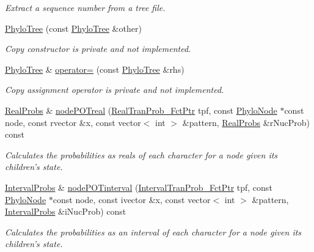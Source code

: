 \begin{DoxyCompactItemize}
\begin{DoxyCompactList}\small\item\em \-Extract a sequence number from a tree file. \end{DoxyCompactList}\item 
\hyperlink{classPhyloTree_a34906f6c4db42266e9f0ccb3057d2cb9}{\-Phylo\-Tree} (const \hyperlink{classPhyloTree}{\-Phylo\-Tree} \&other)
\begin{DoxyCompactList}\small\item\em \-Copy constructor is private and not implemented. \end{DoxyCompactList}\item 
\hyperlink{classPhyloTree}{\-Phylo\-Tree} \& \hyperlink{classPhyloTree_af53d4860d55732c183934881fda283c3}{operator=} (const \hyperlink{classPhyloTree}{\-Phylo\-Tree} \&rhs)
\begin{DoxyCompactList}\small\item\em \-Copy assignment operator is private and not implemented. \end{DoxyCompactList}\item 
\hyperlink{PhyloTree_8hpp_a9a6f7e127d1279875ce95b0b6a331114}{\-Real\-Probs} \& \hyperlink{classPhyloTree_ae7b8d3e72818ebe9eea94906acf541f1}{node\-P\-O\-Treal} (\hyperlink{PhyloTree_8hpp_a4457ee43eaa9b550b64e1542c62f7a6f}{\-Real\-Tran\-Prob\-\_\-\-Fct\-Ptr} tpf, const \hyperlink{classPhyloNode}{\-Phylo\-Node} $\ast$const node, const rvector \&x, const vector$<$ int $>$ \&pattern, \hyperlink{PhyloTree_8hpp_a9a6f7e127d1279875ce95b0b6a331114}{\-Real\-Probs} \&r\-Nuc\-Prob) const 
\begin{DoxyCompactList}\small\item\em \-Calculates the probabilities as reals of each character for a node given its children's state. \end{DoxyCompactList}\item 
\hyperlink{PhyloTree_8hpp_af4bedfc3c110381d3675cf92e28539db}{\-Interval\-Probs} \& \hyperlink{classPhyloTree_a1cb66ffcb92baaeafadd12babc01feba}{node\-P\-O\-Tinterval} (\hyperlink{PhyloTree_8hpp_a6961512ff8fd6fa5a520b93c63c4ad60}{\-Interval\-Tran\-Prob\-\_\-\-Fct\-Ptr} tpf, const \hyperlink{classPhyloNode}{\-Phylo\-Node} $\ast$const node, const ivector \&x, const vector$<$ int $>$ \&pattern, \hyperlink{PhyloTree_8hpp_af4bedfc3c110381d3675cf92e28539db}{\-Interval\-Probs} \&i\-Nuc\-Prob) const 
\begin{DoxyCompactList}\small\item\em \-Calculates the probabilities as an interval of each character for a node given its children's state. \end{DoxyCompactList}\item 

\end{DoxyCompactItemize}

